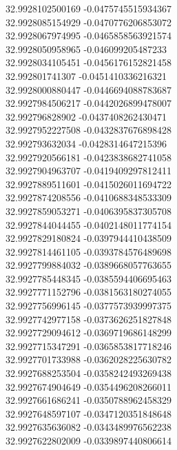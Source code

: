 {32.9928102500169	-0.0475745515934367\\
32.9928085154929	-0.0470776206853072\\
32.9928067974995	-0.0465858563921574\\
32.9928050958965	-0.046099205487233\\
32.9928034105451	-0.0456176152821458\\
32.992801741307	-0.0451410336216321\\
32.9928000880447	-0.0446694088783687\\
32.9927984506217	-0.0442026899478007\\
32.992796828902	-0.0437408262430471\\
32.9927952227508	-0.0432837676898428\\
32.992793632034	-0.0428314647215396\\
32.9927920566181	-0.0423838682741058\\
32.9927904963707	-0.0419409297812411\\
32.9927889511601	-0.0415026011694722\\
32.9927874208556	-0.0410688348533309\\
32.9927859053271	-0.0406395837305708\\
32.9927844044455	-0.0402148011774154\\
32.9927829180824	-0.0397944410438509\\
32.9927814461105	-0.0393784576489698\\
32.9927799884032	-0.0389668057763655\\
32.9927785448345	-0.0385594406695463\\
32.9927771152796	-0.0381563180274055\\
32.9927756996145	-0.0377573939997375\\
32.9927742977158	-0.0373626251827848\\
32.9927729094612	-0.0369719686148299\\
32.9927715347291	-0.0365853817718246\\
32.9927701733988	-0.0362028225630782\\
32.9927688253504	-0.0358242493269438\\
32.9927674904649	-0.0354496208266011\\
32.9927661686241	-0.0350788962458329\\
32.9927648597107	-0.0347120351848648\\
32.9927635636082	-0.0343489976562238\\
32.9927622802009	-0.0339897440806614\\
}
